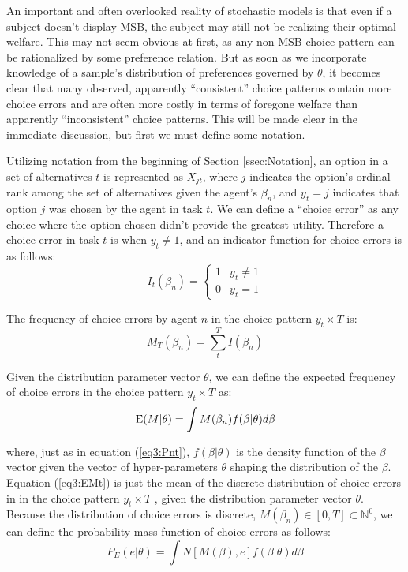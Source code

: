 \documentclass[../main.tex]{subfiles}
\begin{document}
An important and often overlooked reality of stochastic models is that even if a subject doesn't display MSB, the subject may still not be realizing their optimal welfare.
This may not seem obvious at first, as any non-MSB choice pattern can be rationalized by some preference relation.
But as soon as we incorporate knowledge of a sample's distribution of preferences governed by $\theta$, it becomes clear that many observed, apparently \enquote{consistent} choice patterns contain more choice errors and are often more costly in terms of foregone welfare than apparently \enquote{inconsistent} choice patterns.
This will be made clear in the immediate discussion, but first we must define some notation.

Utilizing notation from the beginning of Section \ref{ssec:Notation}, an option in a set of alternatives $t$ is represented as $X_{jt}$, where $j$ indicates the option's ordinal rank among the set of alternatives given the agent's $\beta_n$, and $y_t = j$ indicates that option $j$ was chosen by the agent in task $t$.
We can define a \enquote{choice error} as any choice where the option chosen didn't provide the greatest utility.
Therefore a choice error in task $t$ is when $y_t \neq 1$, and an indicator function for choice errors is as follows:
\begin{equation}
	\label{eq3:Itb}
	I_{t}(\beta_n) = 
	\begin{cases}
		 1 & y_t \neq 1\\
		 0 & y_t = 1
	\end{cases}
\end{equation}

\noindent The frequency of choice errors by agent $n$ in the choice pattern $y_t \times T$ is:
\begin{equation}
	\label{eq3:MTBn}
	M_T(\beta_n) = \sum_t^T I(\beta_n)
\end{equation}

Given the distribution parameter vector $\theta$, we can define the expected frequency of choice errors in the choice pattern $y_t \times T$ as:
\begin{equation}
	\label{eq3:EMt}
	\operatorname{E}(M | \theta) = \int M(\beta_n) f(\beta | \theta) d\beta
\end{equation}

\noindent where, just as in equation (\ref{eq3:Pnt}), $f(\beta|\theta)$ is the density function of the $\beta$ vector given the vector of hyper-parameters $\theta$ shaping the distribution of the $\beta$.
Equation (\ref{eq3:EMt}) is just the mean of the discrete distribution of choice errors in in the choice pattern $y_t \times T$ , given the distribution parameter vector $\theta$.
Because the distribution of choice errors is discrete, $M(\beta_n) \in [0,T] \subset \mathbb{N}^0$, we can define the probability mass function of choice errors as follows{\footnotemark}:
\begin{equation}
	\label{eq3:PE}
	P_E(e | \theta) = \int N[M(\beta),e] f(\beta|\theta) d \beta
\end{equation}
\end{document}
